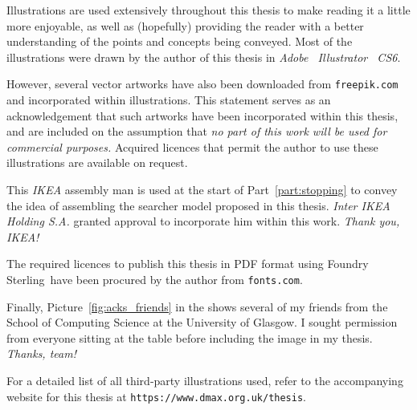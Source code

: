 
\begin{preamble}

Illustrations are used extensively throughout this thesis to make reading it a little more enjoyable, as well as (hopefully) providing the reader with a better understanding of the points and concepts being conveyed. Most of the illustrations were drawn by the author of this thesis in \emph{Adobe \textregistered~Illustrator \textregistered~CS6}.

However, several vector artworks have also been downloaded from \texttt{freepik.com} and incorporated within illustrations. This statement serves as an acknowledgement that such artworks have been incorporated within this thesis, and are included on the assumption that \textit{no part of this work will be used for commercial purposes.} Acquired licences that permit the author to use these illustrations are available on request.

This \textit{IKEA} assembly man is used at the start of Part~\ref{part:stopping} to convey the idea of assembling the searcher model proposed in this thesis. \emph{Inter IKEA Holding S.A.} granted approval to incorporate him within this work. \emph{Thank you, IKEA!}

The required licences to publish this thesis in PDF format using \headerfont\selectfont Foundry Sterling\normalfont\selectfont~have been procured by the author from \texttt{fonts.com}.

Finally, Picture~\ref{fig:acks_friends} in the  shows several of my friends from the School of Computing Science at the University of Glasgow. I sought permission from everyone sitting at the table before including the image in my thesis. \emph{Thanks, team!}

For a detailed list of all third-party illustrations used, refer to the accompanying website for this thesis at \texttt{https://www.dmax.org.uk/thesis}.

\end{preamble}

\newpage